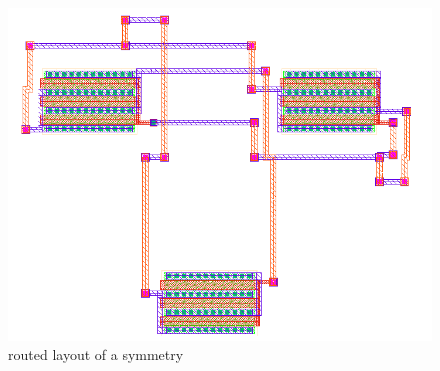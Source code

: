 \begin{figure}	
	\centering	
	\includegraphics[scale=.6]{FIG/symmetry_routed.png}  	
	\caption{routed layout of a symmetry}	
	\label{fig:symmetry_routed}
\end{figure}

